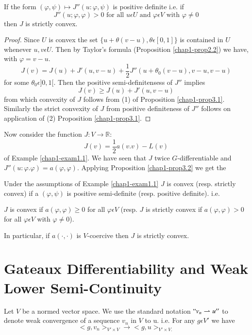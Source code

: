 If the form $(\varphi, \psi) \mapsto J''(u : \varphi, \psi)$ is positive definite i.e. if
$$
J''(u ; \varphi, \varphi) > 0 \text{ for all } u \epsilon U \text{ and } \varphi \epsilon V \text{ with } \varphi \neq 0
$$
then $J$ is strictly convex.

\begin{proof}
Since $U$ is convex the set $\{u + \theta(v - u), \theta \epsilon [0, 1]\}$ is contained in $U$ whenever $u, v \epsilon U$. Then by Taylor's formula (Proposition \ref{chap1-prop2.2}) we have, with $\varphi = v - u$.
$$
J(v) = J(u) + J'(u, v-u) + \frac{1}{2} J''(u+\theta_{0}(v-u), v-u, v-u)
$$
for some $\theta_{0} \epsilon ]0, 1[.$ Then the positive semi-definitensess of $J''$ implies
$$
J(v) \geq J(u) + J'(u, v - u)
$$\pageoriginale
from which convexity of $J$ follows from (1) of Proposition \ref{chap1-prop3.1}. Similarly the strict convexity of $J$ from positive definiteness of $J''$ follows on application of (2) Proposition \ref{chap1-prop3.1}.
\end{proof}

Now consider the function $J : V \to \mathbb{R}:$
$$
J(v) = \frac{1}{2} a(v . v) - L(v)
$$
of Example \ref{chap1-exam1.1}. We have seen that $J$ twice $G$-differentiable and $J''(u : \varphi. \varphi) = a(\varphi, \varphi)$. Applying Proposition \ref{chap1-prop3.2} we get the

\begin{corollary}\label{chap1-coro3.3}
Under the assumptions of Example \ref{chap1-exam1.1} $J$ is convex (resp. strictly convex) if a $(\varphi, \psi)$ is positive semi-definite (resp. positive definite). i.e. 
\end{corollary}
$J$ is convex if $a(\varphi, \varphi) \geq 0$ for all $\varphi \epsilon V$ (resp. $J$ is strictly convex if $a(\varphi, \varphi) > 0$ for all $\varphi \epsilon V$ with $\varphi \neq 0$).

In particular, if $a(\cdot , \cdot)$ is $V$-coercive then $J$ is strictly convex.

\section[Gateaux Differentiability and Weak Lower...]{Gateaux
  Differentiability and Weak Lower Semi-Continuity}\label{chap1-sec4} 
Let $V$ be a normed vector space. We use the standard notation $``v_{n} \rightharpoonup u''$ to denote weak convergence of a sequence $v_{n}$ in $V$ to u. i.e. For any $g \epsilon V'$ we have
$$
<g, v_{n}>_{V' \times V} \to <g, u>_{V' \times V.}
$$

